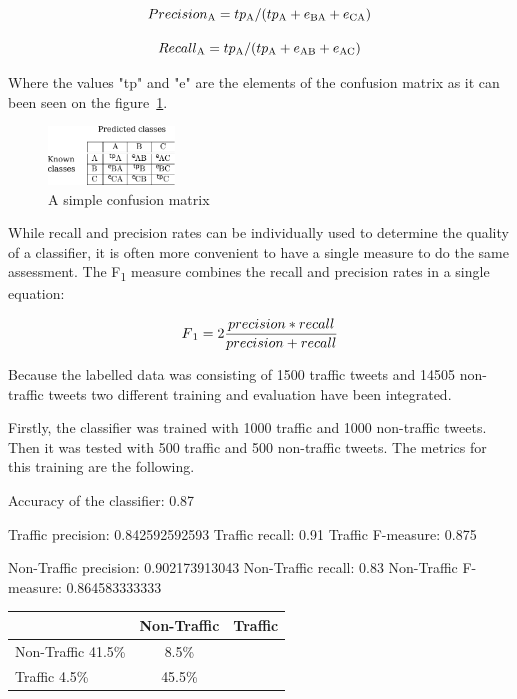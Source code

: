 \[ Precision\textsubscript{A} = tp\textsubscript{A}/(tp\textsubscript{A}+e\textsubscript{BA}+e\textsubscript{CA}) \]

\[ Recall\textsubscript{A} = tp\textsubscript{A}/(tp\textsubscript{A}+e\textsubscript{AB}+e\textsubscript{AC}) \]

Where the values "tp" and "e" are the elements of the confusion matrix as it can been seen on the figure~\ref{fig:confisionMatixCalc}.

\begin{figure}[h]
    \centering
    \includegraphics[width=0.3\textwidth]{confusionMatrixCalc.pdf}
    \caption{A simple confusion matrix}
    \label{fig:confisionMatixCalc}
\end{figure}

While recall and precision rates can be individually used to determine the quality of a classifier, it is often more convenient to have a single measure to do the same assessment. The F\textsubscript{1} measure combines the recall and precision rates in a single equation:

\[ F\textsubscript{1} = 2\frac{precision*recall}{precision+recall} \]

Because the labelled data was consisting of 1500 traffic tweets and 14505 non-traffic tweets two different training and evaluation have been integrated. 

Firstly, the classifier was trained with 1000 traffic and 1000 non-traffic tweets. Then it was tested with 500 traffic and 500 non-traffic tweets. The metrics for this training are the following. 

Accuracy of the classifier:   0.87

Traffic precision:            0.842592592593
Traffic recall:               0.91
Traffic F-measure:            0.875

Non-Traffic precision:        0.902173913043
Non-Traffic recall:           0.83
Non-Traffic F-measure:        0.864583333333

\begin{tabular}{| l || c | c | }
    \hline
          & Non-Traffic & Traffic \\ \hline \hline
        Non-Traffic 41.5\% & 8.5\% \\ \hline
        Traffic 4.5\% & 45.5\% \\ \hline
    \end{tabular}
    \caption{Confusion Matrix with 1000 traffic and 1000 non-traffic tweets.}
    \label{fig:confusionMatrix1}
	

